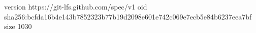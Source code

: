 version https://git-lfs.github.com/spec/v1
oid sha256:bcfda16b4e143b7852323b77b19d2098e601e742c069e7ecb5e84b6237eea7bf
size 1030
